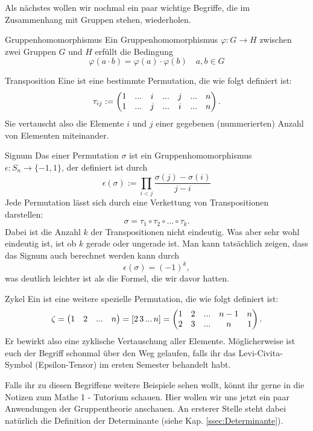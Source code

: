 Als nächstes wollen wir nochmal ein paar wichtige Begriffe, die im Zusammenhang mit Gruppen stehen, wiederholen.
\begin{Wiederholung}
{Gruppenhomomorphismus}
Ein Gruppenhomomorphismus $\varphi: G \rightarrow H$ zwischen zwei Gruppen $G$ und $H$ erfüllt die Bedingung
\begin{equation*}
    \varphi (a\cdot b)=\varphi (a) \cdot \varphi (b) \quad a,b \in G 
\end{equation*}
\end{Wiederholung}
\begin{Wiederholung}
{Transposition}
Eine  ist eine bestimmte Permutation, die wie folgt definiert ist:
\begin{equation*}
    \tau_{ij} := \begin{pmatrix}1 & ... & i & ... & j & ... & n \\ 1 & ... & j & ... & i & ... & n\end{pmatrix}.
\end{equation*}
Sie vertauscht also die Elemente $i$ und $j$ einer gegebenen (nummerierten) Anzahl von Elementen miteinander.
\end{Wiederholung}
\begin{Wiederholung}
{Signum}
Das  einer Permutation $\sigma$ ist ein Gruppenhomomorphismus $\epsilon : S_{n} \rightarrow \{-1,1\}$, der definiert ist durch
\begin{equation*}
    \epsilon (\sigma) := \prod_{i<j} \frac{\sigma(j)-\sigma(i)}{j-i}
\end{equation*}
Jede Permutation lässt sich durch eine Verkettung von Transpositionen darstellen:
\begin{equation*}
    \sigma = \tau_{1}\circ\tau_{2} \circ ... \circ \tau_{k}.
\end{equation*}
Dabei ist die Anzahl $k$ der Transpositionen nicht eindeutig. Was aber sehr wohl eindeutig ist, ist ob $k$ gerade oder ungerade ist. Man kann tatsächlich zeigen, dass das Signum auch berechnet werden kann durch
\begin{equation*}
    \epsilon(\sigma)=(-1)^{k},
\end{equation*}
was deutlich leichter ist als die Formel, die wir davor hatten.
\end{Wiederholung}
\begin{Wiederholung}
{Zykel}
Ein  ist eine weitere spezielle Permutation, die wie folgt definiert ist:
\begin{equation*}
    \zeta = \begin{pmatrix}1 & 2 & ... & n\end{pmatrix} = [2\,3\, ... \, n] = \begin{pmatrix}1 & 2 & ... & n-1 & n \\ 2 & 3 & ... & n & 1\end{pmatrix}.
\end{equation*}
Er bewirkt also eine zyklische Vertauschung aller Elemente. Möglicherweise ist euch der Begriff schonmal über den Weg gelaufen, falls ihr das Levi-Civita-Symbol (Epsilon-Tensor) im ersten Semester behandelt habt.
\end{Wiederholung}
Falls ihr zu diesen Begriffene weitere Beispiele sehen wollt, könnt ihr gerne in die Notizen zum Mathe 1 - Tutorium schauen. Hier wollen wir uns jetzt ein paar Anwendungen der Gruppentheorie anschauen. An ersterer Stelle steht dabei natürlich die Definition der Determinante (siehe Kap. \ref{ssec:Determinante}).


